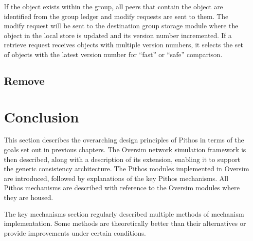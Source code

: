     If the object exists within the group, all peers that contain the object are identified from the group ledger and modify requests are sent to them. The modify request will be sent to the destination group storage module where the object in the local store is updated and its version number incremented. If a retrieve request receives objects with multiple version numbers, it selects the set of objects with the latest version number for ``fast'' or ``safe'' comparison.
\subsection{Remove}


\section{Conclusion}

This section describes the overarching design principles of Pithos in terms of the goals set out in previous chapters. The Oversim network simulation framework is then described, along with a description of its extension, enabling it to support the generic consistency architecture. The Pithos modules implemented in Oversim are introduced, followed by explanations of the key Pithos mechanisms. All Pithos mechanisms are described with reference to the Oversim modules where they are housed.

The key mechanisms section regularly described multiple methods of mechanism implementation. Some methods are theoretically better than their alternatives or provide improvements under certain conditions.
